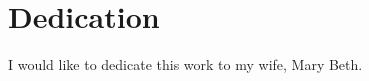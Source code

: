 \documentclass[../thesis.tex]{subfiles}
\begin{document}
\section*{Dedication}
I would like to dedicate this work to my wife, Mary Beth.

\pagebreak
\end{document}
